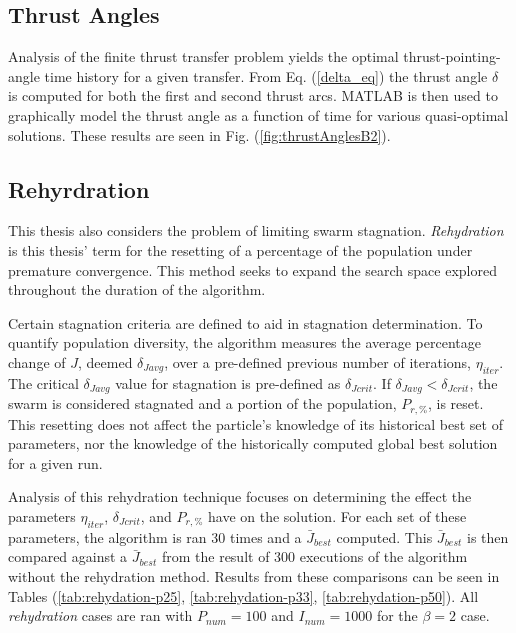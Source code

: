 \subsection{Thrust Angles}

\noindent Analysis of the finite thrust transfer problem yields the optimal thrust-pointing-angle time history for a given transfer. 
From Eq. (\ref{delta_eq}) the thrust angle $\delta$ is computed for both the first and second thrust arcs. MATLAB is then used
to graphically model the thrust angle as a function of time for various quasi-optimal solutions. These results are seen in 
Fig. (\ref{fig:thrustAnglesB2}). \newline

\subsection{Rehyrdration}

\noindent This thesis also considers the problem of limiting swarm stagnation.
\textit{Rehydration} is this thesis' term for the resetting of a percentage of the population under premature convergence.
This method seeks to expand the search space explored throughout the duration of the algorithm. \newline

\noindent Certain stagnation criteria are defined to aid in stagnation determination. To quantify population diversity, the algorithm measures the average
percentage change of $J$, deemed $\delta_{Javg}$, over a pre-defined previous number of iterations, $\eta_{iter}$. The critical 
$\delta_{Javg}$ value for stagnation is pre-defined as $\delta_{Jcrit}$.  If $\delta_{Javg} < \delta_{Jcrit}$, the swarm is considered
stagnated and a portion of the population, $P_{r,\text{\%}}$, is reset. This resetting does not affect the particle's knowledge of its
historical best set of parameters, nor the knowledge of the historically computed global best solution for a given run.\newline

\noindent Analysis of this rehydration technique focuses on determining the effect the parameters $\eta_{iter}$, $\delta_{Jcrit}$,
and $P_{r,\text{\%}}$ have on the solution. For each set of these parameters, the algorithm is ran 30 times and a $\bar{J}_{best}$
computed. This $\bar{J}_{best}$ is then compared against a $\bar{J}_{best}$ from the result of 300 executions of the algorithm without
the rehydration method. Results from these comparisons can be seen in Tables 
(\ref{tab:rehydation-p25}, \ref{tab:rehydation-p33}, \ref{tab:rehydation-p50}).
All \textit{rehydration} cases are ran with $P_{num} = 100$ and $I_{num} = 1000$ for the $\beta=2$ case.



